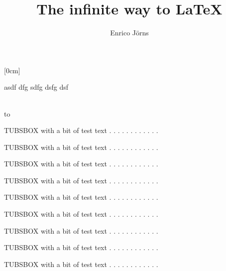 \documentclass[a4paper,portrait]{scrreprt}
\makeatletter
\renewcommand{\maketitle}{%
\setlength{\fboxsep}{0cm}%
\hspace*{-\tubspage@borderwidth}%
\raisebox{\tubspage@borderwidth}[0cm]{%
\colorbox{tuSecondaryLight}{%
  \begin{minipage}[t][\textheight+2\tubspage@borderwidth]{\textwidth+2\tubspage@borderwidth}%
      \LARGE asdf dfg sdfg dsfg dsf
  \end{minipage}%
}}%
\vspace*{-0.75\tulogoHeight}\vspace{-\textheight}\vspace*{-2\tubspage@borderwidth}\\%
\hspace*{-2\tubspage@borderwidth}%
\colorbox{tuRed}{%
\hbox to \tulogoWidth{\vbox to \tulogoHeight{\tubslogo}}%
}\vspace*{-0.25\tulogoHeight}%
}
\makeatother
\begin{document}
\author{Enrico Jörns}
\title{The infinite way to LaTeX}

\maketitle

\newpage



\begin{tubsbox}[tuBlueLight20]{0}{1}{3}{1}
  TUBSBOX with a bit of test text . . . . . . . . . . . .
\end{tubsbox}
\begin{tubsbox}[tuBlueLight20]{3}{1}{3}{1}
  TUBSBOX with a bit of test text . . . . . . . . . . . .
\end{tubsbox}
\begin{tubsbox}[tuBlueLight20]{1}{2}{1}{1}
  TUBSBOX with a bit of test text . . . . . . . . . . . .
\end{tubsbox}
\begin{tubsbox}[tuBlueLight20]{0}{3}{1}{1}
  TUBSBOX with a bit of test text . . . . . . . . . . . .
\end{tubsbox}
\begin{tubsbox}[tuBlueLight20]{1}{4}{1}{1}
  TUBSBOX with a bit of test text . . . . . . . . . . . .
\end{tubsbox}
\begin{tubsbox}[tuBlueLight20]{0}{5}{1}{1}
  TUBSBOX with a bit of test text . . . . . . . . . . . .
\end{tubsbox}
\begin{tubsbox}[tuBlueLight20]{1}{6}{1}{1}
  TUBSBOX with a bit of test text . . . . . . . . . . . .
\end{tubsbox}
\begin{tubsbox}[tuBlueLight20]{0}{7}{1}{1}
  TUBSBOX with a bit of test text . . . . . . . . . . . .
\end{tubsbox}
\begin{tubsbox}[tuBlueLight20]{1}{8}{1}{1}
  TUBSBOX with a bit of test text . . . . . . . . . . . .
\end{tubsbox}
\end{document}
